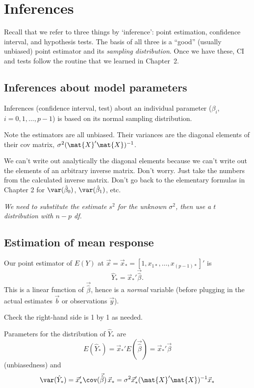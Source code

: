 \documentclass[12pt]{article}
\begin{document}
\section{Inferences}

Recall that we refer to three things by `inference':
point estimation, confidence interval, and hypothesis tests.
The basis of all three is a ``good'' (usually unbiased) point estimator
and its \emph{sampling distribution}.
Once we have these, CI and tests follow the routine that we learned in
Chapter~2.

\subsection{Inferences about model parameters}


Inferences (confidence interval, test)
about an individual parameter ($\beta_i$, $i=0,1,\dotsc,p-1$)
is based on its normal sampling distribution.

Note the estimators are all unbiased.
Their variances are the diagonal elements of their cov matrix,
$\sigma^2 (\mat{X}'\mat{X})^{-1}$.

We can't write out analytically the diagonal elements
because we can't write out the elements of an arbitrary inverse matrix.
Don't worry. Just take the numbers from the calculated inverse matrix.
Don't go back to the elementary formulas in Chapter 2
for $\var(\hat\beta_0)$, $\var(\hat\beta_1)$, etc.

\emph{We need to substitute the estimate $s^2$ for the unknown
$\sigma^2$, then use a $t$ distribution with $n-p$ df.}


\subsection{Estimation of mean response}

Our point estimator of $E(Y)$ at
$\vec{x} = \vec{x}_* = [1, x_{1*},\dotsc, x_{(p-1)*}]'$ is
\[
\hat{Y}_*
= {\vec{x}_*}' \vec{\hat\beta}
.
\]
This is a linear function of $\vec{\hat\beta}$,
hence is a \emph{normal} variable
(before plugging in the actual estimates $\vec{b}$ or observations
$\vec{y}$).

\exercise
Check the right-hand side is 1 by 1 as needed.

Parameters for the distribution of $\hat{Y}_*$ are
\[
E(\hat{Y}_*) = \vec{x}_*' E(\vec{\hat\beta}) = \vec{x}_*' \vec{\beta}
\]
(unbiasedness) and
\begin{equation}\label{eq:inf-mean-var}
\var(\hat{Y}_*)
= \vec{x}_*' \cov(\vec{\hat\beta})\, \vec{x}_*
= \sigma^2 \vec{x}_*' (\mat{X}'\mat{X})^{-1} \vec{x}_*
\end{equation}
\end{document}

